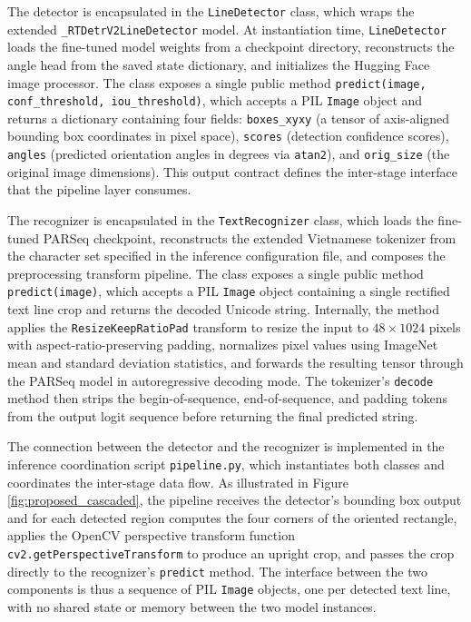 The detector is encapsulated in the \texttt{LineDetector} class, which wraps the extended \texttt{\_RTDetrV2LineDetector} model. At instantiation time, \texttt{LineDetector} loads the fine-tuned model weights from a checkpoint directory, reconstructs the angle head from the saved state dictionary, and initializes the Hugging Face image processor. The class exposes a single public method \texttt{predict(image, conf\_threshold, iou\_threshold)}, which accepts a PIL \texttt{Image} object and returns a dictionary containing four fields: \texttt{boxes\_xyxy} (a tensor of axis-aligned bounding box coordinates in pixel space), \texttt{scores} (detection confidence scores), \texttt{angles} (predicted orientation angles in degrees via \texttt{atan2}), and \texttt{orig\_size} (the original image dimensions). This output contract defines the inter-stage interface that the pipeline layer consumes.

The recognizer is encapsulated in the \texttt{TextRecognizer} class, which loads the fine-tuned PARSeq checkpoint, reconstructs the extended Vietnamese tokenizer from the character set specified in the inference configuration file, and composes the preprocessing transform pipeline. The class exposes a single public method \texttt{predict(image)}, which accepts a PIL \texttt{Image} object containing a single rectified text line crop and returns the decoded Unicode string. Internally, the method applies the \texttt{ResizeKeepRatioPad} transform to resize the input to $48 \times 1024$ pixels with aspect-ratio-preserving padding, normalizes pixel values using ImageNet mean and standard deviation statistics, and forwards the resulting tensor through the PARSeq model in autoregressive decoding mode. The tokenizer's \texttt{decode} method then strips the begin-of-sequence, end-of-sequence, and padding tokens from the output logit sequence before returning the final predicted string.

The connection between the detector and the recognizer is implemented in the inference coordination script \texttt{pipeline.py}, which instantiates both classes and coordinates the inter-stage data flow. As illustrated in Figure \ref{fig:proposed_cascaded}, the pipeline receives the detector's bounding box output and for each detected region computes the four corners of the oriented rectangle, applies the OpenCV perspective transform function \texttt{cv2.getPerspectiveTransform} to produce an upright crop, and passes the crop directly to the recognizer's \texttt{predict} method. The interface between the two components is thus a sequence of PIL \texttt{Image} objects, one per detected text line, with no shared state or memory between the two model instances.

